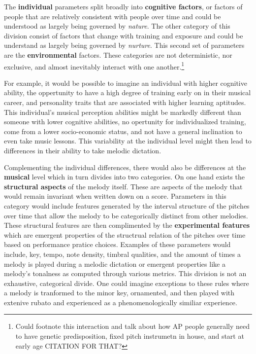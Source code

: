\documentclass[]{book}
\let\rmarkdownfootnote\footnote%
\def\footnote{\protect\rmarkdownfootnote}
\begin{document}
The \textbf{individual} parameters split broadly into \textbf{cognitive factors}, or factors of people that are relatively consistent with people over time and could be understood as largely being governed by \emph{nature}.
The other category of this division consist of factors that change with training and exposure and could be understand as largely being governed by \emph{nurture}.
This second set of parameters are the \textbf{environmental} factors.
These categories are not deterministic, nor exclusive, and almost inevitably interact with one another.\footnote{Could footnote this interaction and talk about how AP people generally need to have genetic predisposition, fixed pitch instrumetn in house, and start at early age CITATION FOR THAT?}

For example, it would be possible to imagine an individual with higher cognitive ability, the oppertunity to have a high degree of training early on in their musical career, and personality traits that are associated with higher learning aptitudes.
This individual's musical perception abilities might be markedly different than someone with lower cognitive abilities, no opertunity for individualized training, come from a lower socio-economic status, and not have a general inclination to even take music lessons.
This variability at the individual level might then lead to differences in their ability to take melodic dictation.

Complementing the individual differences, there would also be differences at the \textbf{musical} level which in turn divides into two categories.
On one hand exists the \textbf{structural aspects} of the melody itself.
These are aspects of the melody that would remain invariant when written down on a score.
Parameters in this category would include features generated by the interval structure of the pitches over time that allow the melody to be categorically distinct from other melodies.
These structural features are then complimented by the \textbf{experimental features} which are emergent properties of the structrual relation of the pitches over time based on performance pratice choices.
Examples of these parameters would include, key, tempo, note density, timbral qualities, and the amount of times a melody is played during a melodic dictation or emergent properties like a melody's tonalness as computed through various metrics.
This division is not an exhaustive, categorical divide.
One could imagine exceptions to these rules where a melody is tranformed to the minor key, ornamented, and then played with extenive rubato and experienced as a phenomenologically similiar experience.
\end{document}
